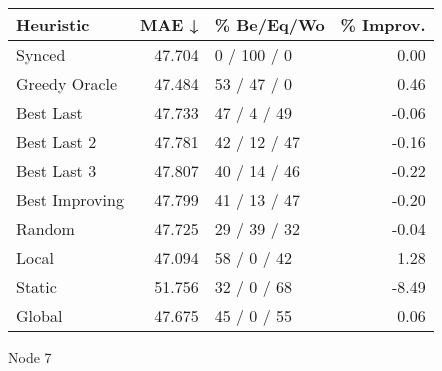 \begin{tabular}{lrlr}
\toprule
\textbf{Heuristic} & \textbf{MAE ↓} & \textbf{\% Be/Eq/Wo} & \textbf{\% Improv.} \\
\midrule
            Synced &         47.704 &          0 / 100 / 0 &                0.00 \\
     Greedy Oracle &         47.484 &          53 / 47 / 0 &                0.46 \\
         Best Last &         47.733 &          47 / 4 / 49 &               -0.06 \\
       Best Last 2 &         47.781 &         42 / 12 / 47 &               -0.16 \\
       Best Last 3 &         47.807 &         40 / 14 / 46 &               -0.22 \\
    Best Improving &         47.799 &         41 / 13 / 47 &               -0.20 \\
            Random &         47.725 &         29 / 39 / 32 &               -0.04 \\
             Local &         47.094 &          58 / 0 / 42 &                1.28 \\
            Static &         51.756 &          32 / 0 / 68 &               -8.49 \\
            Global &         47.675 &          45 / 0 / 55 &                0.06 \\
\bottomrule
\end{tabular}
\caption{Node 7}
\label{tab:iid_lr01_le2_bs4_7}
